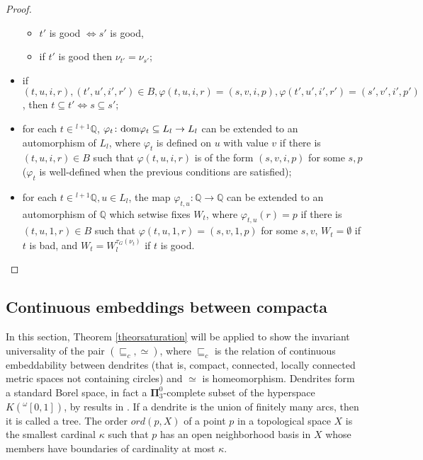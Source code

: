 \documentclass{amsart}
\theoremstyle{definition}
\theoremstyle{remark}
\begin{document}
\begin{proof}
\begin{itemize}
\begin{itemize}
\item $t'$ is good $ \iff s' $ is good,
\item if $t'$ is good then $\nu_{t'}=\nu_{s'}$;
\end{itemize}
\item if $(t,u,i,r),(t',u',i',r')\in B, {\varphi} (t,u,i,r)=(s,v,i,p), {\varphi} (t',u',i',r')=(s',v',i',p')$, then $t\subseteq t' \iff s\subseteq s'$;
\item for each $t \in {}^{l+1} {\mathbb{Q}}$, ${\varphi}_t \colon {\rm dom} {\varphi}_t \subseteq L_l \to L_l$ can
  be extended to an automorphism of $L_l$, where
${\varphi}_t$ is defined on $u$ with value $v$ if there is $(t,u,i,r) \in
B$ such that ${\varphi}(t,u,i,r)$ is of the form
$(s,v,i,p)$ for some $s,p$ (${\varphi}_t$ is well-defined when the
previous conditions are satisfied);
\item for each  $t \in {}^{l+1} {\mathbb{Q}}, u \in L_l$, the map
  ${\varphi}_{t,u} \colon {\mathbb{Q}} \to {\mathbb{Q}}$ can be extended to an
automorphism of ${\mathbb{Q}}$ which setwise fixes $W_t$, where
${\varphi}_{t,u}(r) = p$ if there is $(t,u,1,r) \in B$ such that
${\varphi}(t,u,1,r) = (s,v,1,p)$ for some $s,v$, $W_t= \emptyset$ if $t$ is bad, and
$W_t= W^{\tau_G(\nu_t)}_l$ if $t$ is good. \qedhere
\end{itemize}

\end{proof}

\subsection{Continuous embeddings between compacta}\label{dendrites}

In this section, Theorem \ref{theorsaturation} will be applied to show
the invariant universality of the pair $(\sqsubseteq_c,\simeq )$,
where $\sqsubseteq_c$ is the relation of continuous embeddability
between dendrites (that is, compact, connected, locally connected
metric spaces not containing circles) and $\simeq $ is homeomorphism.
Dendrites form a standard Borel space, in fact a $ \boldsymbol
\Pi^0_3$-complete subset of the hyperspace $K({}^{\omega }[0,1])$, by
results in \cite{CDM2005}.
If a dendrite is the union of finitely many arcs, then it is called a tree.
The order $ord(p,X)$ of a point $p$ in a topological space $X$ is the
smallest cardinal $\kappa $ such that $p$ has an open neighborhood basis in
$X$ whose members have boundaries of cardinality at
most $\kappa $.
\end{document}
